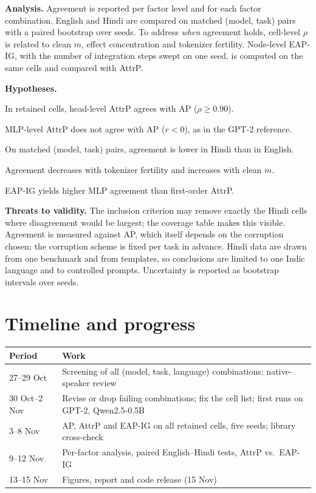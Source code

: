 \documentclass[10pt,a4paper]{article}
\begin{document}
\textbf{Analysis.} Agreement is reported per factor level and for each factor combination. English and Hindi are compared on matched (model, task) pairs with a paired bootstrap over seeds. To address \emph{when} agreement holds, cell-level $\rho$ is related to clean $m$, effect concentration and tokenizer fertility. Node-level EAP-IG, with the number of integration steps swept on one seed, is computed on the same cells and compared with AttrP.

\textbf{Hypotheses.}
\begin{description}[leftmargin=2.4em,itemsep=0.05em]
  \item[(H1)] In retained cells, head-level AttrP agrees with AP ($\rho \ge 0.90$).
  \item[(H2)] MLP-level AttrP does not agree with AP ($r < 0$), as in the GPT-2 reference.
  \item[(H3)] On matched (model, task) pairs, agreement is lower in Hindi than in English.
  \item[(H4)] Agreement decreases with tokenizer fertility and increases with clean $m$.
  \item[(H5)] EAP-IG yields higher MLP agreement than first-order AttrP.
\end{description}

\textbf{Threats to validity.} The inclusion criterion may remove exactly the Hindi cells where disagreement would be largest; the coverage table makes this visible. Agreement is measured against AP, which itself depends on the corruption chosen; the corruption scheme is fixed per task in advance. Hindi data are drawn from one benchmark and from templates, so conclusions are limited to one Indic language and to controlled prompts. Uncertainty is reported as bootstrap intervals over seeds.

\section{Timeline and progress}
\begin{center}\small
\begin{tabular}{@{}ll@{}}
\toprule
Period & Work\\
\midrule
27--29 Oct & Screening of all (model, task, language) combinations; native-speaker review\\
30 Oct--2 Nov & Revise or drop failing combinations; fix the cell list; first runs on GPT-2, Qwen2.5-0.5B\\
3--8 Nov & AP, AttrP and EAP-IG on all retained cells, five seeds; library cross-check\\
9--12 Nov & Per-factor analysis, paired English--Hindi tests, AttrP vs.\ EAP-IG\\
13--15 Nov & Figures, report and code release (15 Nov)\\
\bottomrule
\end{tabular}
\end{center}
\end{document}
